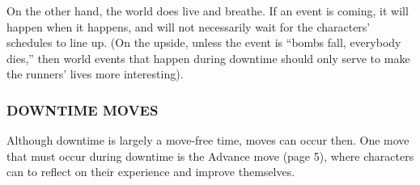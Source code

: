 \documentclass[oneside,10pt]{article}
\begin{document}
\begin{multicols}{2}
  On the other hand, the world does live and breathe. If an event is
  coming, it will happen when it happens, and will not necessarily
  wait for the characters’ schedules to line up. (On the upside,
  unless the event is ``bombs fall, everybody dies,'' then world
  events that happen during downtime should only serve to make the
  runners’ lives more interesting).

  \subsubsection{DOWNTIME MOVES}
  Although downtime is largely a move-free time, moves can occur
  then. One move that must occur during downtime is the Advance move
  (page 5), where characters can to reflect on their experience and
  improve themselves.

\end{multicols}

\newpage


\end{document}
